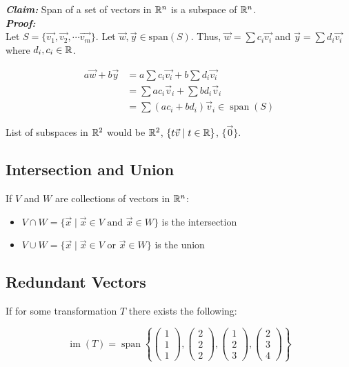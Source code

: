 \noindent
\textbf{\textit{Claim:}} Span of a set of vectors in $\mathbb{R}^n$ is a subspace of $\mathbb{R}^n$.\\
\textbf{\textit{Proof:}}\\
Let $S=\{\vec{v_1},\vec{v_2},\cdots\vec{v_m}\}$. Let $\vec{w},\vec{y}\in \mathrm{span}(S)$.
Thus, $\vec{w}=\sum c_i\vec{v_i}$ and $\vec{y}=\sum d_i\vec{v_i}$ where $d_i,c_i\in \mathbb{R}$.

\begin{align*}
    a\vec{w}+b\vec{y}&=a\sum c_i\vec{v_i}+b\sum d_i\vec{v_i}\\
    &=\sum a c_{i} \vec{v}_{i}+\sum b d_{i} \vec{v}_{i}\\
    &=\sum\left(a c_{i}+b d_{i}\right) \vec{v}_{i} \in \operatorname{span}(S)
\end{align*}

\noindent
List of subspaces in $\mathbb{R}^2$ would be $\mathbb{R}^2$, $\{t\vec{v}\mid t\in\mathbb{R}\}$, $\{\vec{0}\}$.

\subsection{Intersection and Union}

If $V$ and $W$ are collections of vectors in $\mathbb{R}^n$:
\begin{itemize}
    \item $V \cap W=\{\vec{x} \mid \vec{x} \in V \text { and } \vec{x} \in W\}$ is the intersection
    \item $V \cup W=\{\vec{x} \mid \vec{x} \in V \text { or } \vec{x} \in W\}$ is the union
\end{itemize}

\subsection{Redundant Vectors}

If for some transformation $T$ there exists the following:

\[\operatorname{im}(T)=\operatorname{span}\left\{\left(\begin{array}{l}
    1 \\
    1 \\
    1
    \end{array}\right),\left(\begin{array}{l}
    2 \\
    2 \\
    2
    \end{array}\right),\left(\begin{array}{l}
    1 \\
    2 \\
    3
    \end{array}\right),\left(\begin{array}{l}
    2 \\
    3 \\
    4
    \end{array}\right)\right\}\]

